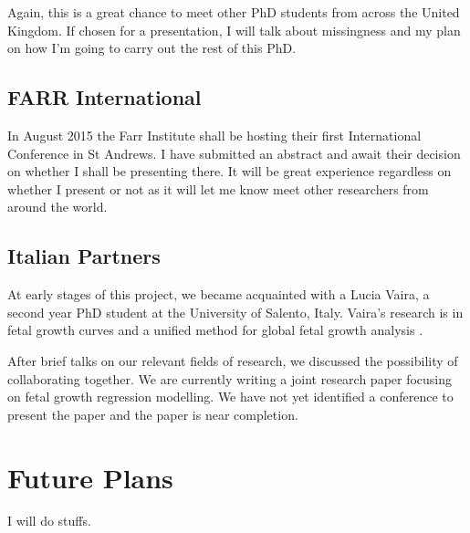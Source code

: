 \documentclass[bsc]{abdnthesis}
\begin{document}
Again, this is a great chance to meet other PhD students from across the United Kingdom. If chosen for a presentation, I will talk about missingness and my plan on how I'm going to carry out the rest of this PhD.
\section{FARR International} %
\label{sec:farr_international}
In August 2015 the Farr Institute shall be hosting their first International Conference in St Andrews\cite{ farr}. I have submitted an abstract and await their decision on whether I shall be presenting there. It will be great experience regardless on whether I present or not as it will let me know meet other researchers from around the world. 
\section{Italian Partners} %
\label{sec:italian_partners}
At early stages of this project, we became acquainted with a Lucia Vaira, a second year PhD student at the University of Salento, Italy. Vaira's research is in fetal growth curves and a unified method for global fetal growth analysis \cite{ luccia1, luccia2, luccia3}. 

After brief talks on our relevant fields of research, we discussed the possibility of collaborating together. We are currently writing a joint research paper focusing on fetal growth regression modelling. We have not yet identified a conference to present the paper and the paper is near completion. 

\chapter{Future Plans}
I will do stuffs.
\end{document}
